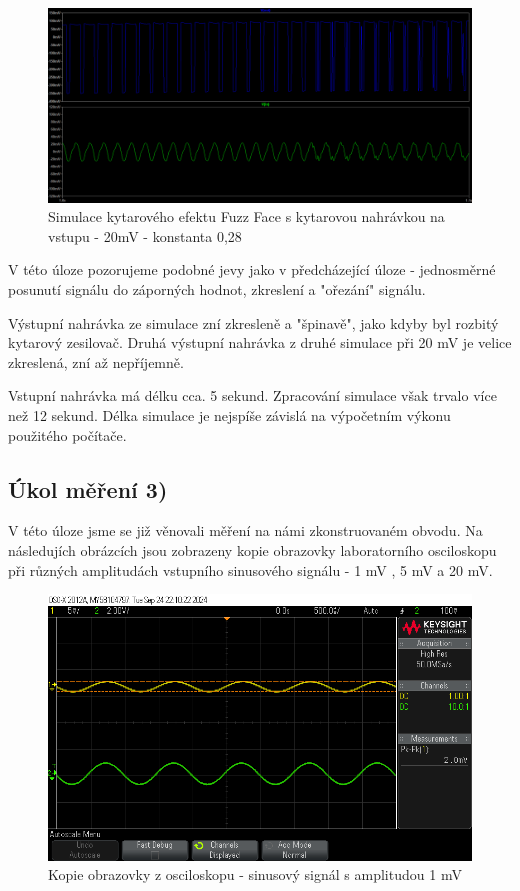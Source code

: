 \documentclass[a4paper, czech]{article}
\begin{document}
\begin{figure}[H]
    \centering
    \includegraphics[width=\linewidth]{3_fuzz_face_zvuk_20mV.png}
    \caption{Simulace kytarového efektu Fuzz Face s kytarovou nahrávkou na vstupu - 20mV - konstanta 0,28}
\end{figure}

V této úloze pozorujeme podobné jevy jako v předcházející úloze - jednosměrné posunutí signálu do záporných hodnot, zkreslení a "ořezání" signálu.

Výstupní nahrávka ze simulace zní zkresleně a "špinavě", jako kdyby byl rozbitý kytarový zesilovač.
Druhá výstupní nahrávka z druhé simulace při 20 mV je velice zkreslená, zní až nepříjemně.

Vstupní nahrávka má délku cca. 5 sekund. Zpracování simulace však trvalo více než 12 sekund.
Délka simulace je nejspíše závislá na výpočetním výkonu použitého počítače.

\subsection{Úkol měření 3)}

V této úloze jsme se již věnovali měření na námi zkonstruovaném obvodu.
Na následujích obrázcích jsou zobrazeny kopie obrazovky laboratorního osciloskopu při různých amplitudách vstupního sinusového signálu - 1 mV , 5 mV a 20 mV.

\begin{figure}[H]
    \centering
    \includegraphics[width=\linewidth]{4_osciloskop.png}
    \caption{Kopie obrazovky z osciloskopu - sinusový signál s amplitudou 1 mV}
\end{figure}
\end{document}
